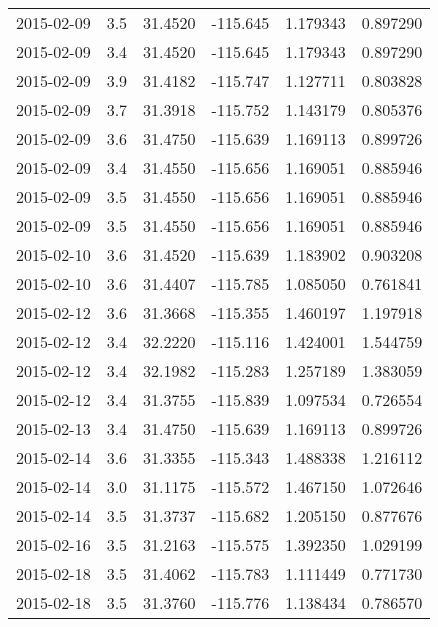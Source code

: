 \begin{tabular}{lrrrrr}
2015-02-09 &       3.5 &  31.4520 &  -115.645 &         1.179343 &         0.897290 \\
2015-02-09 &       3.4 &  31.4520 &  -115.645 &         1.179343 &         0.897290 \\
2015-02-09 &       3.9 &  31.4182 &  -115.747 &         1.127711 &         0.803828 \\
2015-02-09 &       3.7 &  31.3918 &  -115.752 &         1.143179 &         0.805376 \\
2015-02-09 &       3.6 &  31.4750 &  -115.639 &         1.169113 &         0.899726 \\
2015-02-09 &       3.4 &  31.4550 &  -115.656 &         1.169051 &         0.885946 \\
2015-02-09 &       3.5 &  31.4550 &  -115.656 &         1.169051 &         0.885946 \\
2015-02-09 &       3.5 &  31.4550 &  -115.656 &         1.169051 &         0.885946 \\
2015-02-10 &       3.6 &  31.4520 &  -115.639 &         1.183902 &         0.903208 \\
2015-02-10 &       3.6 &  31.4407 &  -115.785 &         1.085050 &         0.761841 \\
2015-02-12 &       3.6 &  31.3668 &  -115.355 &         1.460197 &         1.197918 \\
2015-02-12 &       3.4 &  32.2220 &  -115.116 &         1.424001 &         1.544759 \\
2015-02-12 &       3.4 &  32.1982 &  -115.283 &         1.257189 &         1.383059 \\
2015-02-12 &       3.4 &  31.3755 &  -115.839 &         1.097534 &         0.726554 \\
2015-02-13 &       3.4 &  31.4750 &  -115.639 &         1.169113 &         0.899726 \\
2015-02-14 &       3.6 &  31.3355 &  -115.343 &         1.488338 &         1.216112 \\
2015-02-14 &       3.0 &  31.1175 &  -115.572 &         1.467150 &         1.072646 \\
2015-02-14 &       3.5 &  31.3737 &  -115.682 &         1.205150 &         0.877676 \\
2015-02-16 &       3.5 &  31.2163 &  -115.575 &         1.392350 &         1.029199 \\
2015-02-18 &       3.5 &  31.4062 &  -115.783 &         1.111449 &         0.771730 \\
2015-02-18 &       3.5 &  31.3760 &  -115.776 &         1.138434 &         0.786570 \\

\end{tabular}
